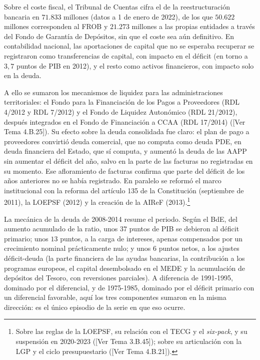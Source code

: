 \documentclass[10pt,a4paper]{article}
\newcommand{\authorfont}[1]{{\fontfamily{EBGaramond-TLF}\selectfont #1}}
\begin{document}
Sobre el coste fiscal, el Tribunal de Cuentas cifra el de la reestructuración bancaria en $71.833$ millones (datos a 1 de enero de 2022), de los que $50.622$ millones corresponden al FROB y $21.273$ millones a las propias entidades a través del Fondo de Garantía de Depósitos, sin que el coste sea aún definitivo. En contabilidad nacional, las aportaciones de capital que no se esperaba recuperar se registraron como transferencias de capital, con impacto en el déficit (en torno a $3,7$ puntos de PIB en 2012), y el resto como activos financieros, con impacto solo en la deuda.

A ello se sumaron los mecanismos de liquidez para las administraciones territoriales: el Fondo para la Financiación de los Pagos a Proveedores (RDL 4/2012 y RDL 7/2012) y el Fondo de Liquidez Autonómico (RDL 21/2012), después integrados en el Fondo de Financiación a CCAA (RDL 17/2014) ([\authorfont{Ver Tema 4.B.25}]). Su efecto sobre la deuda consolidada fue claro: el plan de pago a proveedores convirtió deuda comercial, que no computa como deuda PDE, en deuda financiera del Estado, que sí computa, y aumentó la deuda de las AAPP sin aumentar el déficit del año, salvo en la parte de las facturas no registradas en su momento. Ese afloramiento de facturas confirma que parte del déficit de los años anteriores no se había registrado. En paralelo se reformó el marco institucional con la reforma del artículo 135 de la Constitución (septiembre de 2011), la LOEPSF (2012) y la creación de la AIReF (2013).\footnote{Sobre las reglas de la LOEPSF, su relación con el TECG y el \textit{six-pack}, y su suspensión en 2020-2023 ([\authorfont{Ver Tema 3.B.45}]); sobre su articulación con la LGP y el ciclo presupuestario ([\authorfont{Ver Tema 4.B.21}]).
}

La mecánica de la deuda de 2008-2014 resume el periodo. Según el BdE, del aumento acumulado de la ratio, unos $37$ puntos de PIB se debieron al déficit primario; unos $13$ puntos, a la carga de intereses, apenas compensados por un crecimiento nominal prácticamente nulo; y unos $6$ puntos netos, a los ajustes déficit-deuda (la parte financiera de las ayudas bancarias, la contribución a los programas europeos, el capital desembolsado en el MEDE y la acumulación de depósitos del Tesoro, con reversiones parciales). A diferencia de 1991-1995, dominado por el diferencial, y de 1975-1985, dominado por el déficit primario con un diferencial favorable, aquí los tres componentes sumaron en la misma dirección: es el único episodio de la serie en que eso ocurre.
\end{document}
